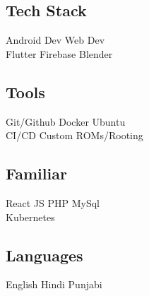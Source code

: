 \documentclass[]{deedy-resume-openfont}
\begin{document}
\begin{minipage}[t]{0.33\textwidth}
\subsection{Tech Stack}
\textbullet{} Android Dev \textbullet{} Web Dev \\ \textbullet{} Flutter \textbullet{} Firebase \textbullet{} Blender \\
\sectionsep

\subsection{Tools}
\textbullet{} Git/Github \textbullet{} Docker \textbullet{} Ubuntu \\ \textbullet{} CI/CD \textbullet{} Custom ROMs/Rooting \\
\sectionsep

\subsection{Familiar}
\textbullet{} React JS \textbullet{} PHP \textbullet{} MySql \\ \textbullet{} Kubernetes
\sectionsep

\subsection{Languages}
\textbullet{} English \textbullet{} Hindi \textbullet{} Punjabi
\sectionsep

%
%

\end{minipage} 
\hfill
\end{document}
